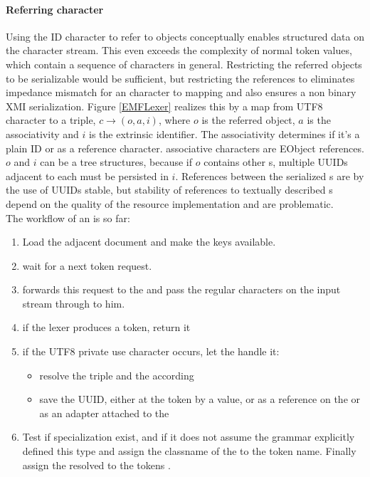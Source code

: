 \paragraph{Referring character} \label{lexer:RefEObj} Using the ID character to refer to objects conceptually enables structured data on the character stream. This even exceeds the complexity of normal token values, which contain a sequence of characters in general. Restricting the referred objects to be serializable would be sufficient, but restricting the references to  eliminates impedance mismatch for an character to  mapping and also ensures a non binary XMI serialization. Figure \ref{EMFLexer} realizes this by a map from UTF8 character to a triple, $c \rightarrow (o,a,i)$, where $o$ is the referred object, $a$ is the associativity and $i$ is the extrinsic identifier. The associativity determines if it's a plain ID or as a reference character.  associative characters are EObject references. $o$ and $i$ can be a tree structures, because if $o$ contains other s, multiple UUIDs adjacent to each  must be persisted in $i$. References between the serialized s are by the use of UUIDs stable, but stability of references to textually described s depend on the quality of the resource implementation and are problematic. \\
The workflow of an  is so far:
\begin{enumerate}
	\item Load the adjacent document and make the keys available.
	\item wait for a next token request.
	\item forwards this request to the  and pass the regular characters on the input stream through to him.
	\item if the lexer produces a token, return it
	\item if the UTF8 private use character occurs, let the  handle it:
		\begin{itemize}
			\item resolve the triple and the according 
			\item save the UUID, either at the token by a value, or as a reference on the  or as an adapter attached to the  
		\end{itemize} 
	\item Test if specialization  exist, and if it does not assume the grammar explicitly defined this type and assign the classname of the  to the token name. Finally assign the resolved  to the tokens .
\end{enumerate}

